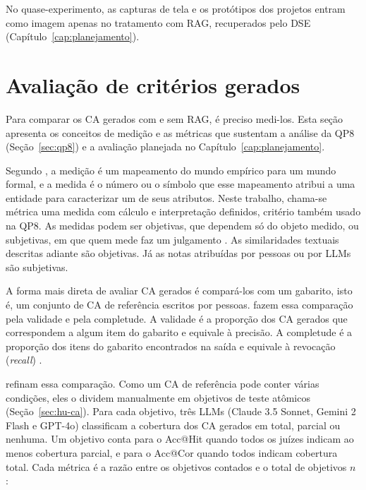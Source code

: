 No quase-experimento, as capturas de tela e os protótipos dos projetos entram como imagem apenas no tratamento com RAG, recuperados pelo DSE (Capítulo~\ref{cap:planejamento}).

\section{Avaliação de critérios gerados}
\label{sec:ref-avaliacao}

Para comparar os CA gerados com e sem RAG, é preciso medi-los. Esta seção apresenta os conceitos de medição e as métricas que sustentam a análise da QP8 (Seção~\ref{sec:qp8}) e a avaliação planejada no Capítulo~\ref{cap:planejamento}.

Segundo , a medição é um mapeamento do mundo empírico para um mundo formal, e a medida é o número ou o símbolo que esse mapeamento atribui a uma entidade para caracterizar um de seus atributos. Neste trabalho, chama-se métrica uma medida com cálculo e interpretação definidos, critério também usado na QP8. As medidas podem ser objetivas, que dependem só do objeto medido, ou subjetivas, em que quem mede faz um julgamento \cite[p.~28]{wohlin2000}. As similaridades textuais descritas adiante são objetivas. Já as notas atribuídas por pessoas ou por LLMs são subjetivas.



A forma mais direta de avaliar CA gerados é compará-los com um gabarito, isto é, um conjunto de CA de referência escritos por pessoas.  fazem essa comparação pela validade e pela completude. A validade é a proporção dos CA gerados que correspondem a algum item do gabarito e equivale à precisão. A completude é a proporção dos itens do gabarito encontrados na saída e equivale à revocação (\textit{recall}) \cite[p.~26--27]{li2024}.

 refinam essa comparação. Como um CA de referência pode conter várias condições, eles o dividem manualmente em objetivos de teste atômicos (Seção~\ref{sec:hu-ca}). Para cada objetivo, três LLMs (Claude 3.5 Sonnet, Gemini 2 Flash e GPT-4o) classificam a cobertura dos CA gerados em total, parcial ou nenhuma. Um objetivo conta para o Acc@Hit quando todos os juízes indicam ao menos cobertura parcial, e para o Acc@Cor quando todos indicam cobertura total. Cada métrica é a razão entre os objetivos contados e o total de objetivos $n$ \cite[p.~3341]{wang2025}:

